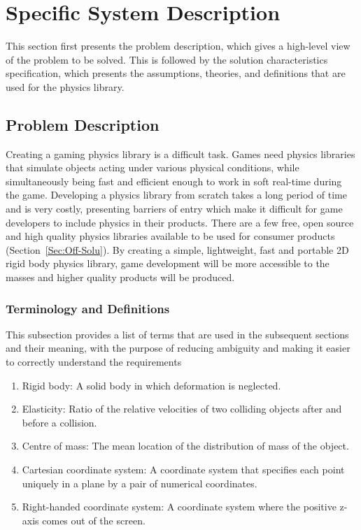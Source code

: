 \documentclass[12pt]{article}
\begin{document}
\section{Specific System Description}
\label{Sec:SpecSystDesc}
This section first presents the problem description, which gives a high-level view of the problem to be solved. This is followed by the solution characteristics specification, which presents the assumptions, theories, and definitions that are used for the physics library.
\subsection{Problem Description}
\label{Sec:ProbDesc}
Creating a gaming physics library is a difficult task. Games need physics libraries that simulate objects acting under various physical conditions, while simultaneously being fast and efficient enough to work in soft real-time during the game. Developing a physics library from scratch takes a long period of time and is very costly, presenting barriers of entry which make it difficult for game developers to include physics in their products. There are a few free, open source and high quality physics libraries available to be used for consumer products (Section~\ref{Sec:Off-Solu}). By creating a simple, lightweight, fast and portable 2D rigid body physics library, game development will be more accessible to the masses and higher quality products will be produced.
\subsubsection{Terminology and Definitions}
\label{Sec:TermandDefi}
This subsection provides a list of terms that are used in the subsequent sections and their meaning, with the purpose of reducing ambiguity and making it easier to correctly understand the requirements
\begin{enumerate}
\item{Rigid body: A solid body in which deformation is neglected.}
\item{Elasticity: Ratio of the relative velocities of two colliding objects after and before a collision.}
\item{Centre of mass: The mean location of the distribution of mass of the object.}
\item{Cartesian coordinate system: A coordinate system that specifies each point uniquely in a plane by a pair of numerical coordinates.}
\item{Right-handed coordinate system: A coordinate system where the positive z-axis comes out of the screen.}
\end{enumerate}
\end{document}
